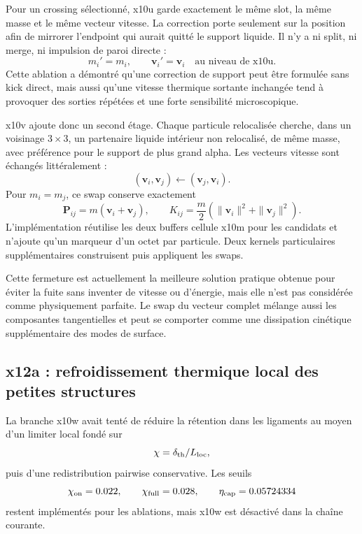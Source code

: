 \documentclass[11pt,a4paper]{article}
\begin{document}
Pour un crossing sélectionné, x10u garde exactement le même slot, la même masse et le même vecteur vitesse. La correction porte seulement sur la position afin de mirrorer l'endpoint qui aurait quitté le support liquide. Il n'y a ni split, ni merge, ni impulsion de paroi directe :
\begin{equation}
  m_i'=m_i,\qquad
  \bm v_i'=\bm v_i
  \quad\text{au niveau de x10u.}
\end{equation}
Cette ablation a démontré qu'une correction de support peut être formulée sans kick direct, mais aussi qu'une vitesse thermique sortante inchangée tend à provoquer des sorties répétées et une forte sensibilité microscopique.

x10v ajoute donc un second étage. Chaque particule relocalisée cherche, dans un voisinage $3\times3$, un partenaire liquide intérieur non relocalisé, de même masse, avec préférence pour le support de plus grand alpha. Les vecteurs vitesse sont échangés littéralement :
\begin{equation}
  (\bm v_i,\bm v_j)
  \longleftarrow
  (\bm v_j,\bm v_i).
\end{equation}
Pour $m_i=m_j$, ce swap conserve exactement
\begin{equation}
  \bm P_{ij}=m(\bm v_i+\bm v_j),
  \qquad
  K_{ij}=\frac{m}{2}\left(\|\bm v_i\|^2+\|\bm v_j\|^2\right).
\end{equation}
L'implémentation réutilise les deux buffers cellule x10m pour les candidats et n'ajoute qu'un marqueur d'un octet par particule. Deux kernels particulaires supplémentaires construisent puis appliquent les swaps.

Cette fermeture est actuellement la meilleure solution pratique obtenue pour éviter la fuite sans inventer de vitesse ou d'énergie, mais elle n'est pas considérée comme physiquement parfaite. Le swap du vecteur complet mélange aussi les composantes tangentielles et peut se comporter comme une dissipation cinétique supplémentaire des modes de surface.

\subsection{x12a : refroidissement thermique local des petites structures}

La branche x10w avait tenté de réduire la rétention dans les ligaments au moyen d'un limiter local fondé sur
\[
  \chi=\delta_{\rm th}/L_{\rm loc},
\]
puis d'une redistribution pairwise conservative. Les seuils
\[
  \chi_{\rm on}=0.022,\qquad
  \chi_{\rm full}=0.028,\qquad
  \eta_{\rm cap}=0.05724334
\]
restent implémentés pour les ablations, mais x10w est désactivé dans la chaîne courante.
\end{document}

